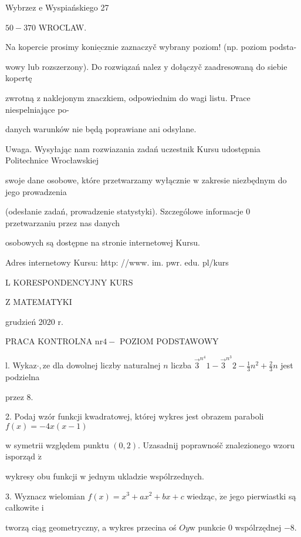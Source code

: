 \documentclass[a4paper,12pt]{article}
\begin{document}
Wybrzez $\mathrm{e}$ Wyspiańskiego 27

$50-370$ WROCLAW.

Na kopercie prosimy $\underline{\mathrm{k}\mathrm{o}\mathrm{n}\mathrm{i}\mathrm{e}\mathrm{c}\mathrm{z}\mathrm{n}\mathrm{i}\mathrm{e}}$ zaznaczyč wybrany poziom! (np. poziom podsta-

wowy lub rozszerzony). Do rozwiązań nalez $\mathrm{y}$ dołączyč zaadresowaną do siebie kopertę

zwrotną $\mathrm{z}$ naklejonym znaczkiem, odpowiednim do wagi listu. Prace niespelniające po-

danych warunków nie będą poprawiane ani odsylane.

Uwaga. Wysyłając nam rozwiazania zadań uczestnik Kursu udostępnia Politechnice Wrocławskiej

swoje dane osobowe, które przetwarzamy wyłącznie $\mathrm{w}$ zakresie niezbędnym do jego prowadzenia

(odesłanie zadań, prowadzenie statystyki). Szczególowe informacje $0$ przetwarzaniu przez nas danych

osobowych są dostępne na stronie internetowej Kursu.

Adres internetowy Kursu: http: //www. im. pwr. edu. pl/kurs







L KORESPONDENCYJNY KURS

Z MATEMATYKI

grudzień 2020 r.

PRACA KONTROLNA $\mathrm{n}\mathrm{r} 4-$ POZIOM PODSTAWOWY

l. Wykaz$\cdot, \mathrm{z}\mathrm{e}$ dla dowolnej liczby naturalnej $n$ liczba $\displaystyle \vec{3}^{n^{4}}1-\vec{3}^{n^{3}}2-\frac{1}{3}n^{2}+\frac{2}{3}n$ jest podzielna

przez 8.

2. Podaj wzór funkcji kwadratowej, której wykres jest obrazem paraboli $f(x)=-4x(x-1)$

$\mathrm{w}$ symetrii względem punktu $(0,2)$. Uzasadnij poprawnośč znalezionego wzoru $\mathrm{i}\mathrm{s}$porząd $\acute{\mathrm{z}}$

wykresy obu funkcji $\mathrm{w}$ jednym ukladzie wspólrzednych.

3. Wyznacz wielomian $f(x)=x^{3}+ax^{2}+bx+c$ wiedząc, $\dot{\mathrm{z}}\mathrm{e}$ jego pierwiastki są całkowite $\mathrm{i}$

tworzą ciąg geometryczny, a wykres przecina oś $Oy\mathrm{w}$ punkcie $0$ wspólrzędnej $-8.$
\end{document}
